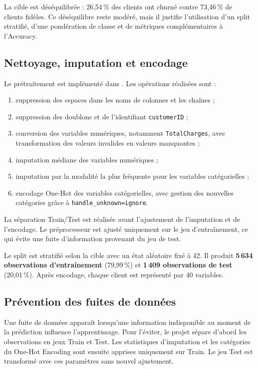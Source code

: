 \documentclass[12pt, a4paper]{article}
\newcommand{\filepath}[1]{\texttt{\detokenize{#1}}}
\begin{document}
La cible est déséquilibrée : 26,54\,\% des clients ont churné contre
73,46\,\% de clients fidèles. Ce déséquilibre reste modéré, mais il justifie
l'utilisation d'un split stratifié, d'une pondération de classe et de métriques
complémentaires à l'Accuracy.

\subsection{Nettoyage, imputation et encodage}

Le prétraitement est implémenté dans \filepath{src/preprocessing.py}. Les
opérations réalisées sont :
\begin{enumerate}[leftmargin=*]
    \item suppression des espaces dans les noms de colonnes et les chaînes ;
    \item suppression des doublons et de l'identifiant \texttt{customerID} ;
    \item conversion des variables numériques, notamment
    \texttt{TotalCharges}, avec transformation des valeurs invalides en valeurs
    manquantes ;
    \item imputation médiane des variables numériques ;
    \item imputation par la modalité la plus fréquente pour les variables
    catégorielles ;
    \item encodage One-Hot des variables catégorielles, avec gestion des
    nouvelles catégories grâce à \texttt{handle\_unknown=ignore}.
\end{enumerate}

\begin{warningbox}
La séparation Train/Test est réalisée avant l'ajustement de l'imputation et de
l'encodage. Le préprocesseur est ajusté uniquement sur le jeu d'entraînement,
ce qui évite une fuite d'information provenant du jeu de test.
\end{warningbox}

Le split est stratifié selon la cible avec un état aléatoire fixé à 42. Il
produit \textbf{5\,634 observations d'entraînement} (79,99\,\%) et
\textbf{1\,409 observations de test} (20,01\,\%). Après encodage, chaque client
est représenté par 40 variables.

\subsection{Prévention des fuites de données}

Une fuite de données apparaît lorsqu'une information indisponible au moment de
la prédiction influence l'apprentissage. Pour l'éviter, le projet sépare
d'abord les observations en jeux Train et Test. Les statistiques d'imputation
et les catégories du One-Hot Encoding sont ensuite apprises uniquement sur
Train. Le jeu Test est transformé avec ces paramètres sans nouvel ajustement.
\end{document}
